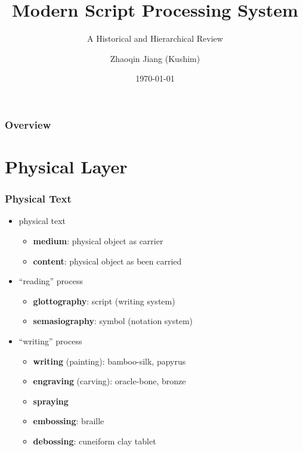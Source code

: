 \documentclass{beamer}
\title[MSPS]{Modern Script Processing System}
\subtitle{A Historical and Hierarchical Review}
\author{Zhaoqin Jiang (Kushim)}
\institute{
	Institute of Software, Chinese Academy of Sciences \\ 
	\medskip
	\url{https://github.com/Kushim-Jiang/msps} \\
    \url{mailto:jiangzhaoqin@iscas.ac.cn}
}
\date{\today}
\begin{document}
	
	\begin{frame}
		\titlepage
	\end{frame}
	
	\begin{frame}
		\frametitle{Overview}
		\tableofcontents
	\end{frame}

	
	\section{Physical Layer}
	
	\begin{frame}
		\frametitle{Physical Text}

		\begin{itemize}
			\item physical text
			\begin{itemize}
				\item \textbf{medium}: physical object as carrier
				\item \textbf{content}: physical object as been carried
			\end{itemize}
			\item ``reading'' process
			\begin{itemize}
				\item \textbf{glottography}: script (writing system)
				\item \textbf{semasiography}: symbol (notation system)
			\end{itemize}
			\item ``writing'' process
			\begin{itemize}
				\item \textbf{writing} (painting): bamboo-silk, papyrus
				\item \textbf{engraving} (carving): oracle-bone, bronze
				\item \textbf{spraying}
				\item \textbf{embossing}: braille
				\item \textbf{debossing}: cuneiform clay tablet
			\end{itemize}
		\end{itemize}
	\end{frame}
	
\end{document}
